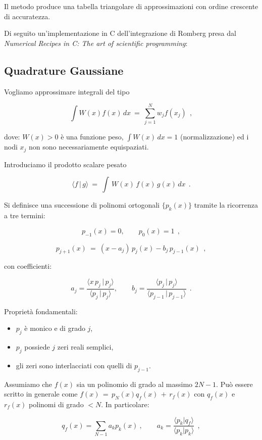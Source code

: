 Il metodo produce una tabella triangolare di approssimazioni con ordine crescente di accuratezza.

Di seguito un'implementazione in C dell'integrazione di Romberg presa dal \emph{Numerical Recipes in C: The art of scientific programming}:




\subsection{Quadrature Gaussiane}
Vogliamo approssimare integrali del tipo

\[\int W(x) f(x)\, dx\ =\ \sum_{j=1}^{N} w_j f(x_j)\ \ ,\]

dove: $W(x) > 0$ è una funzione peso, $\int W(x)\,dx = 1$ (normalizzazione) ed i nodi $x_j$ non sono necessariamente equispaziati.

Introduciamo il prodotto scalare pesato

\[\langle f\, |\, g \rangle\ =\ \int\, W(x)\, f(x)\, g(x)\, dx\ \ .\]

Si definisce una successione di polinomi ortogonali $\{p_k(x)\}$ tramite la ricorrenza a tre termini:

\[ p_{-1}(x)=0, \qquad p_0(x)=1\ \ ,\]

\[ p_{j+1}(x)\ =\ (x-a_j)\, p_j(x) - b_j\, p_{j-1}(x)\ \ ,\]

con coefficienti:

\[a_j = \frac{\langle x\, p_j\, |\, p_j \rangle}{\langle p_j\, |\, p_j \rangle},
\qquad
b_j =\frac{\langle p_j\, |\, p_j \rangle}{\langle p_{j-1}\, |\, p_{j-1} \rangle}\ \ .
\]

Proprietà fondamentali:

\begin{itemize}
	\item $p_j$ è monico e di grado $j$,
	\item $p_j$ possiede $j$ zeri reali semplici,
	\item gli zeri sono interlacciati con quelli di $p_{j-1}$.
\end{itemize}

Assumiamo che $f(x)$ sia un polinomio di grado al massimo $2N-1$. Può essere scritto in generale come $f(x)\,=\, p_N(x)q_f(x)\,+\, r_f(x)$ con $q_f(x)$ e $r_f(x)$ polinomi di grado $<N$. In particolare:

\[ q_f(x)=\sum_{N-1} a_k p_k (x)\ , \qquad a_k=\frac{\langle p_k|q_f\rangle}{\langle p_k |p_k\rangle}\ \ ,\]

